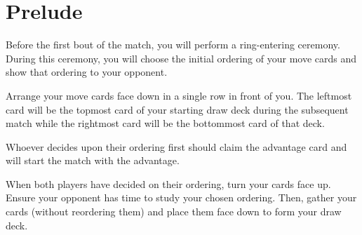 \section*{Prelude}
Before the first bout of the match, you will perform a ring-entering ceremony.
During this ceremony, you will choose the initial ordering of your move cards and show that ordering to your opponent.

Arrange your move cards face down in a single row in front of you.
The leftmost card will be the topmost card of your starting draw deck during the subsequent match while the rightmost card will be the bottommost card of that deck.

Whoever decides upon their ordering first should claim the advantage card and will start the match with the advantage.

When both players have decided on their ordering, turn your cards face up.
Ensure your opponent has time to study your chosen ordering.
Then, gather your cards (without reordering them) and place them face down to form your draw deck.
%
